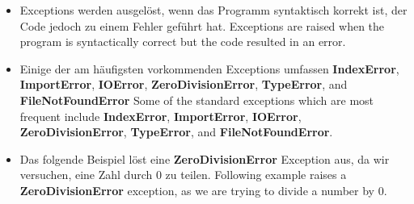 \documentclass[12pt,c, german, aspectratio=169]{beamer} %
\begin{document}
     \begin{frame}{}
        \begin{itemize}
          \item \trans
          {Exceptions werden ausgelöst, wenn das Programm syntaktisch korrekt ist, der Code jedoch zu einem Fehler geführt hat.}
          {Exceptions are raised when the program is syntactically correct but the code resulted in an error.}
          \item \trans
          {Einige der am häufigsten vorkommenden Exceptions umfassen \textbf{IndexError}, \textbf{ImportError}, \textbf{IOError}, \textbf{ZeroDivisionError}, \textbf{TypeError}, and \textbf{FileNotFoundError}}
          {Some of the standard exceptions which are most frequent include \textbf{IndexError}, \textbf{ImportError}, \textbf{IOError}, \textbf{ZeroDivisionError}, \textbf{TypeError}, and \textbf{FileNotFoundError}.}
           \item \trans
          {Das folgende Beispiel löst eine \textbf{ZeroDivisionError} Exception aus, da wir versuchen, eine Zahl durch 0 zu teilen.}
          {Following example raises a \textbf{ZeroDivisionError} exception, as we are trying to divide a number by 0.}
          \\
          \vspace{0.3cm}
          \\
          \vspace{0.1cm}
        \end{itemize}
      \end{frame}
      
\end{document}
